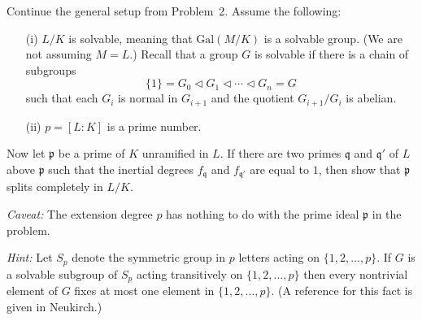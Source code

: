 \documentclass[12pt]{article}  %
\begin{document}
\begin{problem}
Continue the general setup from Problem~2. Assume the following:
\begin{enumerate}
    \item[(i)] $L/K$ is solvable, meaning that $\mathrm{Gal}(M/K)$ is a solvable group. (We are not assuming $M=L$.) Recall that a group $G$ is solvable if there is a chain of subgroups
          \[\{1\} = G_0 \triangleleft G_1 \triangleleft \cdots \triangleleft G_n = G\]
          such that each $G_i$ is normal in $G_{i+1}$ and the quotient $G_{i+1}/G_i$ is abelian.
    \item[(ii)] $p = [L:K]$ is a prime number.
\end{enumerate}

Now let $\mathfrak{p}$ be a prime of $K$ unramified in $L$. If there are two primes $\mathfrak{q}$ and $\mathfrak{q}'$ of $L$ above $\mathfrak{p}$ such that the inertial degrees $f_{\mathfrak{q}}$ and $f_{\mathfrak{q}'}$ are equal to $1$, then show that $\mathfrak{p}$ splits completely in $L/K$.

\textit{Caveat:} The extension degree $p$ has nothing to do with the prime ideal $\mathfrak{p}$ in the problem.

\textit{Hint:} Let $S_p$ denote the symmetric group in $p$ letters acting on $\{1,2,\dots,p\}$. If $G$ is a solvable subgroup of $S_p$ acting transitively on $\{1,2,\dots,p\}$ then every nontrivial element of $G$ fixes at most one element in $\{1,2,\dots,p\}$. (A reference for this fact is given in Neukirch.)
\end{problem}
\end{document}
